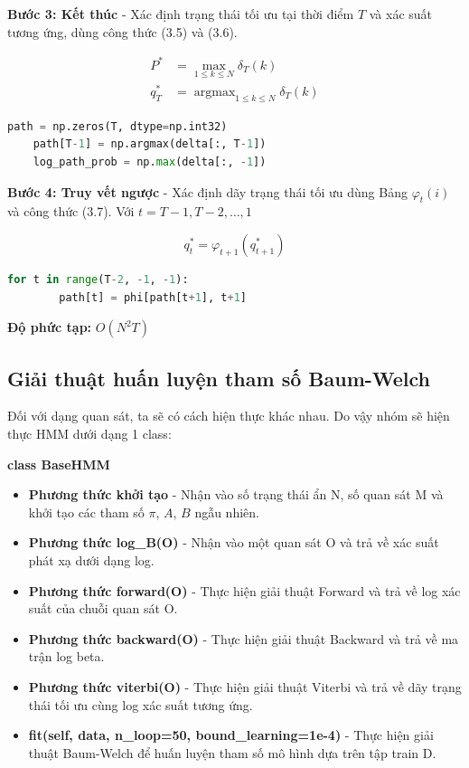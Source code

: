 \documentclass[twoside, final]{hcmut_report}
\begin{document}
\textbf{Bước 3: Kết thúc} - Xác định trạng thái tối ưu tại thời điểm $T$ và xác suất tương ứng, dùng công thức (3.5) và (3.6).

\begin{align}
P^* &= \max_{1 \leq k \leq N} \delta_T(k) \tag{3.5} \\
q_T^* &= \operatorname{argmax}_{1 \leq k \leq N} \delta_T(k) \tag{3.6}
\end{align}

\begin{tcolorbox}
\begin{lstlisting}[language=Python]
    path = np.zeros(T, dtype=np.int32)
    path[T-1] = np.argmax(delta[:, T-1])
    log_path_prob = np.max(delta[:, -1])
\end{lstlisting}
\end{tcolorbox}

\textbf{Bước 4: Truy vết ngược} - Xác định dãy trạng thái tối ưu dùng Bảng $\varphi_t(i)$ và công thức (3.7). Với $t = T-1, T-2, \ldots, 1$

\begin{equation}
q_t^* = \varphi_{t+1}(q_{t+1}^*) \tag{3.7}
\end{equation}

\begin{tcolorbox}
\begin{lstlisting}[language=Python]
    for t in range(T-2, -1, -1):
        path[t] = phi[path[t+1], t+1]
\end{lstlisting}
\end{tcolorbox}

\textbf{Độ phức tạp:} $O(N^2T)$

\subsection{Giải thuật huấn luyện tham số Baum-Welch}

Đối với dạng quan sát, ta sẽ có cách hiện thực khác nhau. Do vậy nhóm sẽ hiện thực HMM dưới dạng 1 class:

\textbf{class BaseHMM}

\begin{itemize}
\item \textbf{Phương thức khởi tạo} - Nhận vào số trạng thái ẩn N, số quan sát M và khởi tạo các tham số $\pi$, $A$, $B$ ngẫu nhiên.
\item \textbf{Phương thức log\_B(O)} - Nhận vào một quan sát O và trả về xác suất phát xạ dưới dạng log.
\item \textbf{Phương thức forward(O)} - Thực hiện giải thuật Forward và trả về log xác suất của chuỗi quan sát O.
\item \textbf{Phương thức backward(O)} - Thực hiện giải thuật Backward và trả về ma trận log beta.
\item \textbf{Phương thức viterbi(O)} - Thực hiện giải thuật Viterbi và trả về dãy trạng thái tối ưu cùng log xác suất tương ứng.
\item \textbf{fit(self, data, n\_loop=50, bound\_learning=1e-4)} - Thực hiện giải thuật Baum-Welch để huấn luyện tham số mô hình dựa trên tập train D.
\end{itemize}
\end{document}
